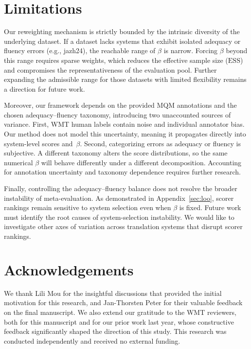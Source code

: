 \documentclass[11pt]{article}
\begin{document}
\section*{Limitations}

Our reweighting mechanism is strictly bounded by the intrinsic diversity of the underlying dataset. If a dataset lacks systems that exhibit isolated adequacy or fluency errors (e.g., jazh24), the reachable range of $\beta$ is narrow. Forcing $\beta$ beyond this range requires sparse weights, which reduces the effective sample size ($\mathrm{ESS}$) and compromises the representativeness of the evaluation pool. Further expanding the admissible range for those datasets with limited flexibility remains a direction for future work.

Moreover, our framework depends on the provided MQM annotations and the chosen adequacy--fluency taxonomy, introducing two unaccounted sources of variance. First, WMT human labels contain noise and individual annotator bias. Our method does not model this uncertainty, meaning it propagates directly into system-level scores and~$\beta$. Second, categorizing errors as adequacy or fluency is subjective. A different taxonomy alters the score distributions, so the same numerical $\beta$ will behave differently under a different decomposition. Accounting for annotation uncertainty and taxonomy dependence requires further research.

Finally, controlling the adequacy--fluency balance does not resolve the broader instability of meta-evaluation. As demonstrated in Appendix~\ref{sec:loo}, scorer rankings remain sensitive to system selection even when $\beta$ is fixed. Future work must identify the root causes of system-selection instability. We would like to investigate other axes of variation across translation systems that disrupt scorer rankings.

\section*{Acknowledgements}
We thank Lili Mou for the insightful discussions that provided the initial motivation for this research, and Jan-Thorsten Peter for their valuable feedback on the final manuscript. We also extend our gratitude to the WMT reviewers, both for this manuscript and for our prior work last year, whose constructive feedback significantly shaped the direction of this study. This research was conducted independently and received no external funding.
\end{document}
